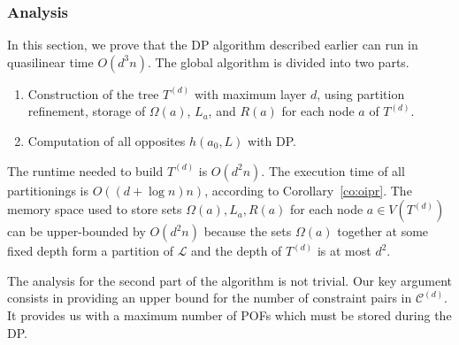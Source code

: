 \documentclass[a4paper,UKenglish,numberwithinsect,cleveref, autoref,anonymous]{lipics-v2021}
\begin{document}
\subsubsection{Analysis} \label{subsubsec:analysis_wopp}

In this section, we prove that the DP algorithm described earlier can run in quasilinear time $O(d^3n)$. The global algorithm is divided into two parts.
\begin{enumerate}
\item Construction of the tree $T^{(d)}$ with maximum layer $d$, using partition refinement, storage of $\Omega(a)$, $L_a$, and $R(a)$ for each node $a$ of $T^{(d)}$.
\item Computation of all opposites $h(a_0,L)$ with DP.
\end{enumerate}
The runtime needed to build $T^{(d)}$ is $O(d^2n)$. The execution time of all partitionings is $O((d+\log n)n)$, according to Corollary~\ref{co:oipr}.
The memory space used to store sets $\Omega(a),L_a,R(a)$ for each node $a\in V(T^{(d)})$ can be upper-bounded by $O(d^2n)$ because the sets $\Omega(a)$ together at some fixed depth form a partition of $\mathcal{L}$ and the depth of $T^{(d)}$ is at most $d^2$.

The analysis for the second part of the algorithm is not trivial. Our key argument consists in providing an upper bound for the number of constraint pairs in $\mathcal{C}^{(d)}$. It provides us with a maximum number of POFs which must be stored during the DP.
\end{document}
